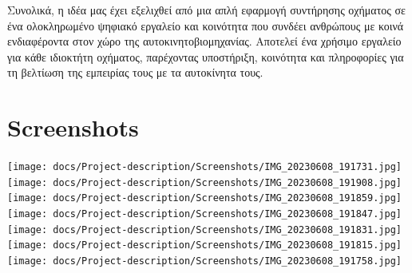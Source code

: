 \documentclass[11pt]{scrartcl} %
\begin{document}
Συνολικά, η ιδέα μας έχει εξελιχθεί από μια απλή εφαρμογή συντήρησης οχήματος σε ένα ολοκληρωμένο ψηφιακό εργαλείο και κοινότητα που συνδέει ανθρώπους με κοινά ενδιαφέροντα στον χώρο της αυτοκινητοβιομηχανίας. Αποτελεί ένα χρήσιμο εργαλείο για κάθε ιδιοκτήτη οχήματος, παρέχοντας υποστήριξη, κοινότητα και πληροφορίες για τη βελτίωση της εμπειρίας τους με τα αυτοκίνητα τους.

\section{Screenshots}
\centering
\texttt{[image: docs/Project-description/Screenshots/IMG\_20230608\_191731.jpg]}
\\
\centering
\texttt{[image: docs/Project-description/Screenshots/IMG\_20230608\_191908.jpg]}
\\
\centering
\texttt{[image: docs/Project-description/Screenshots/IMG\_20230608\_191859.jpg]}
\\
\centering
\texttt{[image: docs/Project-description/Screenshots/IMG\_20230608\_191847.jpg]}
\\
\centering
\texttt{[image: docs/Project-description/Screenshots/IMG\_20230608\_191831.jpg]}
\\
\centering
\texttt{[image: docs/Project-description/Screenshots/IMG\_20230608\_191815.jpg]}
\\
\centering
\texttt{[image: docs/Project-description/Screenshots/IMG\_20230608\_191758.jpg]}

% 
\end{document}
